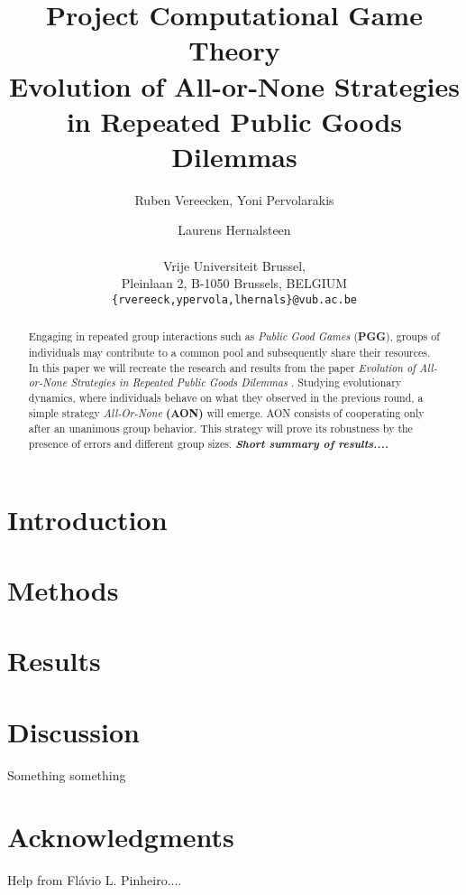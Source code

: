 \documentclass[letterpaper]{article}
\title{Project Computational Game Theory\\Evolution of All-or-None Strategies in Repeated Public Goods Dilemmas}
\author{Ruben Vereecken, Yoni Pervolarakis \and Laurens Hernalsteen \\
\mbox{}\\Vrije Universiteit Brussel, \\Pleinlaan 2, B-1050 Brussels, BELGIUM\\
{\texttt{\{rvereeck,ypervola,lhernals\}@vub.ac.be}}}
\begin{document}
\maketitle

\begin{abstract}
Engaging in repeated group interactions such as \textit{Public Good Games}  (\textbf{PGG}), groups of individuals may contribute to a common pool and subsequently share their resources. In this paper we will recreate the research and results from the paper  \textit{Evolution of All-or-None Strategies in Repeated Public Goods Dilemmas}  \citep{project}. Studying evolutionary dynamics, where individuals behave on what they observed in the previous round, a simple strategy \textit{All-Or-None} \textbf{(AON)} will emerge. AON consists of cooperating only after an unanimous group behavior. This strategy will prove its robustness by the presence of errors and different group sizes.
\textit{\textbf{Short summary of results....}}


\end{abstract}

\section{Introduction}



\section{Methods}




\section{Results}






\section{Discussion}
Something something

\section{Acknowledgments}

Help from Flávio L. Pinheiro....


\footnotesize


\end{document}
